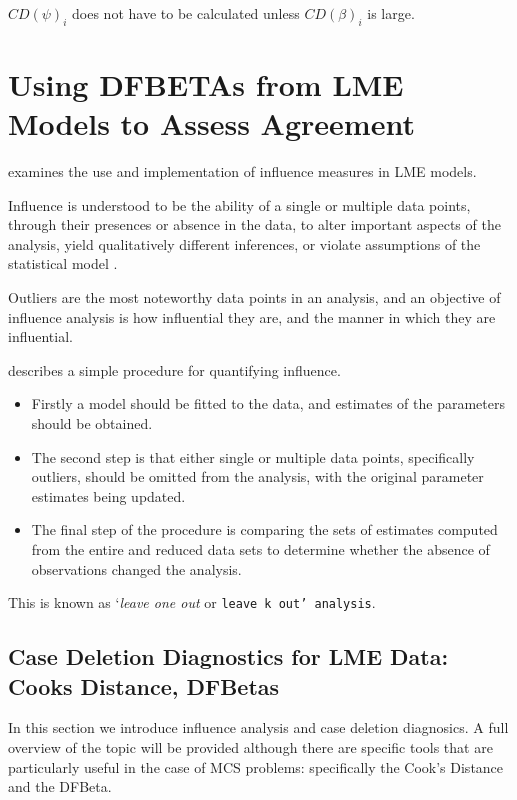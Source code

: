 \documentclass[12pt, a4paper]{report}
\theoremstyle{plain}
\theoremstyle{definition}
\theoremstyle{remark}
\begin{document}
$CD(\psi)_i$ does not have to be calculated unless $CD(\beta)_i$ is large.









\chapter{Using DFBETAs from LME Models to Assess Agreement}


\citet{schabenberger} examines the use and implementation of influence measures in LME models.

Influence is understood to be the ability of a single or multiple data points, through their presences or absence in the data, to alter important aspects of the analysis, yield qualitatively 	different inferences, or violate assumptions of the statistical
model \citep{schabenberger}.

Outliers are the most noteworthy data points in an analysis, and an objective of influence analysis is how influential they are,
and the manner in which they are influential.

\citet{schabenberger} describes a simple procedure for quantifying influence.
\begin{itemize}
	\item Firstly a model should be fitted to the data, and
	estimates of the parameters should be obtained.
	\item The second step is that either single or multiple data points, specifically outliers,
	should be omitted from the analysis, with the original parameter
	estimates being updated.
	\item  The final step of the procedure is comparing the 	sets of estimates computed from the entire and reduced data sets
	to determine whether the absence of observations changed the
	analysis.
\end{itemize}
This is known as `\textit{leave one out} or \texttt{leave k
	out' analysis}.






\section*{Case Deletion Diagnostics for LME Data: Cooks Distance, DFBetas}
In this section we introduce influence analysis and case deletion diagnosics. A full overview of the topic will be provided although there are specific tools that are particularly useful in the case of MCS problems: specifically the Cook's Distance and the DFBeta.
\end{document}
